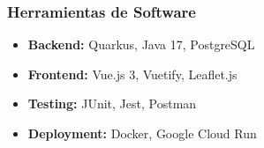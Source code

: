 \subsubsection{Herramientas de Software}
\begin{itemize}
    \item \textbf{Backend:} Quarkus, Java 17, PostgreSQL
    \item \textbf{Frontend:} Vue.js 3, Vuetify, Leaflet.js
    \item \textbf{Testing:} JUnit, Jest, Postman
    \item \textbf{Deployment:} Docker, Google Cloud Run
\end{itemize}

